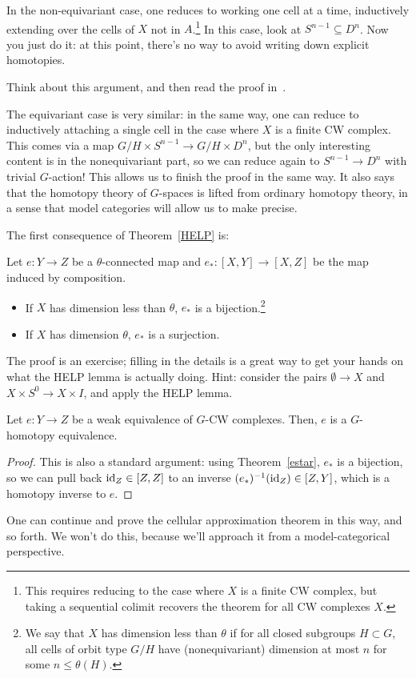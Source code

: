 In the non-equivariant case, one reduces to working one cell at a time, inductively extending over the cells of $X$
not in $A$.\footnote{This requires reducing to the case where $X$ is a finite CW complex, but taking a sequential
colimit recovers the theorem for all CW complexes $X$.} In this case, look at $S^{n-1}\subseteq D^n$. Now you just
do it: at this point, there's no way to avoid writing down explicit homotopies.
\begin{ex}
Think about this argument, and then read the proof in~\cite{ConciseCourse}.
\end{ex}
The equivariant case is very similar: in the same way, one can reduce to inductively attaching a single cell in the
case where $X$ is a finite CW complex. This comes via a map $G/H\times S^{n-1}\to G/H\times D^n$, but the only
interesting content is in the nonequivariant part, so we can reduce again to $S^{n-1}\to D^n$ with trivial
$G$-action! This allows us to finish the proof in the same way. It also says that the homotopy theory of $G$-spaces
is lifted from ordinary homotopy theory, in a sense that model categories will allow us to make precise.

The first consequence of Theorem~\ref{HELP} is:
\begin{thm}
\label{estar}
Let $e:Y\to Z$ be a $\theta$-connected map and $e_*: [X,Y]\to [X,Z]$ be the map induced by composition.
\begin{itemize}
	\item If $X$ has dimension less than $\theta$, $e_*$ is a bijection.\footnote{We say that $X$ has dimension
	less than $\theta$ if for all closed subgroups $H\subset G$, all cells of orbit type $G/H$ have
	(nonequivariant) dimension at most $n$ for some $n \leq \theta(H)$.}
	\item If $X$ has dimension $\theta$, $e_*$ is a surjection.
\end{itemize}
\end{thm}
The proof is an exercise; filling in the details is a great way to get your hands on what the HELP lemma is
actually doing. Hint: consider the pairs $\emptyset\to X$ and $X\times S^0\to X\times I$, and apply the HELP lemma.
\begin{cor}
\label{eqWhite}
Let $e:Y\to Z$ be a weak equivalence of $G$-CW complexes. Then, $e$ is a $G$-homotopy equivalence.
\end{cor}
\begin{proof}
This is also a standard argument: using Theorem~\ref{estar}, $e_*$ is a bijection, so we can pull back
$\mathrm{id}_Z\in[Z,Z]$ to an inverse $(e_*)^{-1}(\mathrm{id}_Z)\in [Z,Y]$, which is a homotopy inverse to $e$.
\end{proof}
One can continue and prove the cellular approximation theorem in this way, and so forth. We won't do this, because
we'll approach it from a model-categorical perspective.

